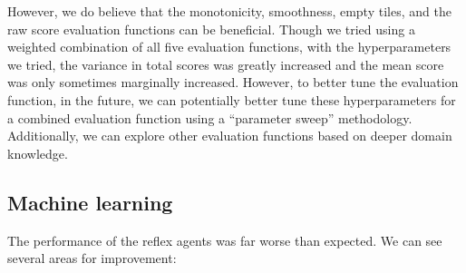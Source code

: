 \documentclass[9pt,twocolumn]{article}
\begin{document}
However, we do believe that the monotonicity, smoothness, empty tiles, and the raw score evaluation functions can be beneficial. Though we tried using a weighted combination of all five evaluation functions, with the hyperparameters we tried, the variance in total scores was greatly increased and the mean score was only sometimes marginally increased. However, to better tune the evaluation function, in the future, we can potentially better tune these hyperparameters for a combined evaluation function using a “parameter sweep” methodology. Additionally, we can explore other evaluation functions based on deeper domain knowledge.

\subsection{Machine learning}

The performance of the reflex agents was far worse than expected. We can see several areas for improvement:
\end{document}
